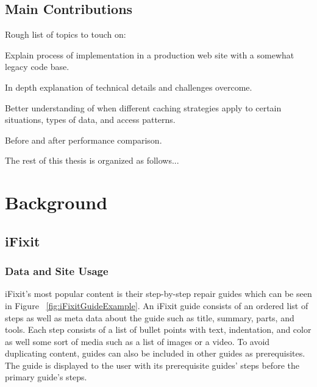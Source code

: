 \documentclass[12pt]{ucthesis}
\begin{document}
\section{Main Contributions}
Rough list of topics to touch on:

Explain process of implementation in a production web site with a somewhat legacy code base.

In depth explanation of technical details and challenges overcome.

Better understanding of when different caching strategies apply to certain situations, types of data, and access patterns.

Before and after performance comparison.

The rest of this thesis is organized as follows...


\chapter{Background}
\label{background}

\section{iFixit}

\subsection{Data and Site Usage}
\textsf{iFixit}'s most popular content is their step-by-step repair guides which can be seen in Figure ~\ref{fig:iFixitGuideExample}.
An \textsf{iFixit} guide consists of an ordered list of steps as well as meta data about the guide such as title, summary, parts, and tools.
Each step consists of a list of bullet points with text, indentation, and color as well some sort of media such as a list of images or a video.
To avoid duplicating content, guides can also be included in other guides as prerequisites.
The guide is displayed to the user with its prerequisite guides' steps before the primary guide's steps.
\end{document}
